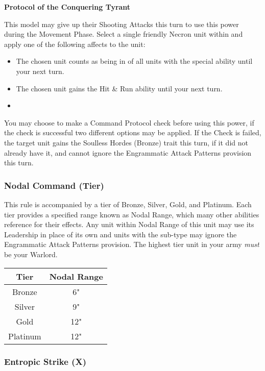 \textbf{Protocol of the Conquering Tyrant}

This model may give up their Shooting Attacks this turn to use this power during the Movement Phase. Select a single friendly Necron unit within  and apply one of the following affects to the unit:

\begin{itemize}
	\itemsep 0pt
	\item The chosen unit counts as being in  of all units with the  special ability until your next turn.
	\item The chosen unit gains the Hit \& Run ability until your next turn.
	\item 
\end{itemize}

You may choose to make a Command Protocol check before using this power, if the check is successful two different options may be applied. If the Check is failed, the target unit gains the Soulless Hordes (Bronze) trait this turn, if it did not already have it, and cannot ignore the Engrammatic Attack Patterns provision this turn.

\subsubsection{Nodal Command (Tier)} \label{Nodal Command}

This rule is accompanied by a tier of Bronze, Silver, Gold, and Platinum. Each tier provides a specified range known as Nodal Range, which many other abilities reference for their effects. Any unit within Nodal Range of this unit may use its Leadership in place of its own and units with the  sub-type may ignore the Engrammatic Attack Patterns provision. The highest tier unit in your army \textit{must} be your Warlord.

\label{Nodal Range}
\begin{tabular}{|c|c|}
	\hline
	Tier & Nodal Range \\
	\hline
	Bronze & 6" \\
	Silver & 9" \\
	Gold & 12" \\
	Platinum & 12" \\
	\hline
\end{tabular}


\subsubsection{Entropic Strike (X)} \label{Entropic Strike}

